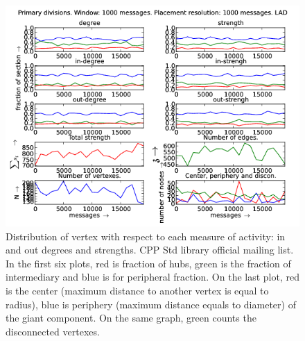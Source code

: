 \documentclass[%
 aip,
 jmp,%
 amsmath,amssymb,
 reprint,%
]{revtex4-1}
\begin{document}
\begin{figure}[hbtp] 
   \centering
        \includegraphics[width=\textwidth]{figs/LAD/1000}
    \caption{Distribution of vertex with respect to each measure of activity: in and out degrees and strengths. CPP Std library official mailing list. In the first six plots, red is fraction of hubs, green is the fraction of intermediary and blue is for peripheral fraction. On the last plot, red is the center (maximum distance to another vertex is equal to radius), blue is periphery (maximum distance equals to diameter) of the giant component. On the same graph, green counts the disconnected vertexes.}
    \label{fig:lad1000}
\end{figure}
\end{document}
